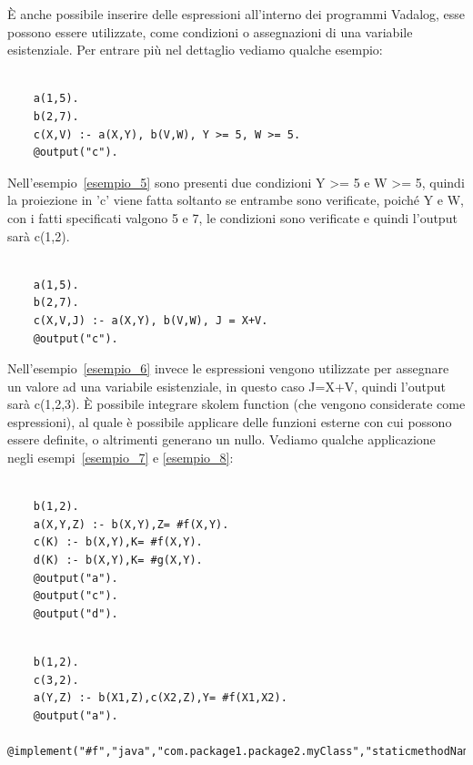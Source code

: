 È anche possibile inserire delle espressioni all'interno dei programmi Vadalog, esse possono essere utilizzate, come condizioni o assegnazioni di una variabile esistenziale. Per entrare più nel dettaglio vediamo qualche esempio: 
\begin{example}\label{esempio_5}
\normalfont
{}
\begin{lstlisting}

	a(1,5). 
	b(2,7). 
	c(X,V) :- a(X,Y), b(V,W), Y >= 5, W >= 5. 
	@output("c"). 
\end{lstlisting}
\end{example} 
Nell'esempio~\ref{esempio_5} sono presenti due condizioni Y >= 5 e W >= 5, quindi la proiezione in 'c' viene fatta soltanto se entrambe sono verificate, poiché Y e W, con i fatti specificati valgono 5 e 7, le condizioni sono verificate e quindi l'output sarà c(1,2). \newline
\begin{example}\label{esempio_6}
\normalfont
{}
\begin{lstlisting}

	a(1,5). 
	b(2,7). 
	c(X,V,J) :- a(X,Y), b(V,W), J = X+V. 
	@output("c").
\end{lstlisting}
\end{example}
Nell'esempio~\ref{esempio_6} invece le espressioni vengono utilizzate per assegnare un valore ad una variabile esistenziale, in questo caso J=X+V, quindi l'output sarà c(1,2,3). \newline
È possibile integrare skolem function (che vengono considerate come espressioni), al quale è possibile applicare delle funzioni esterne con cui possono essere definite, o altrimenti generano un nullo. Vediamo qualche applicazione negli esempi~\ref{esempio_7} e \ref{esempio_8}:
\begin{example}\label{esempio_7}
\normalfont
{}
\begin{lstlisting}

	b(1,2). 
	a(X,Y,Z) :- b(X,Y),Z= #f(X,Y). 
	c(K) :- b(X,Y),K= #f(X,Y). 
	d(K) :- b(X,Y),K= #g(X,Y). 
	@output("a"). 
	@output("c"). 
	@output("d"). 
\end{lstlisting}
\end{example}
\begin{example}\label{esempio_8}
\normalfont
{}
\begin{lstlisting}

	b(1,2). 
	c(3,2). 
	a(Y,Z) :- b(X1,Z),c(X2,Z),Y= #f(X1,X2). 
	@output("a"). 
	@implement("#f","java","com.package1.package2.myClass","staticmethodName").
\end{lstlisting}
\end{example}
